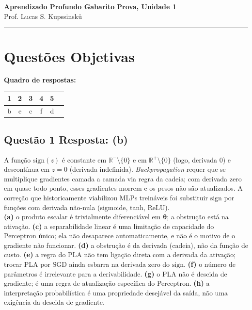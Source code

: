 \documentclass[11pt,a4paper]{article}
\begin{document}
{\Large\bfseries Aprendizado Profundo \textemdash{} Gabarito} \hfill \textbf{Prova, Unidade 1}\\
Prof. Lucas S. Kupssinskü

\rule{\linewidth}{0.8pt}

\section*{Questões Objetivas}

\textbf{Quadro de respostas:}
\begin{center}
\begin{tabular}{|c|c|c|c|c|c|}
\hline
1 & 2 & 3 & 4 & 5 \\\hline
b & e & c & f & d \\\hline
\end{tabular}
\end{center}

\color{blue}

\subsection*{Questão 1 \textemdash{} Resposta: (b)}
A função $\mathrm{sign}(z)$ é constante em $\mathbb{R}^- \setminus \{0\}$ e em $\mathbb{R}^+ \setminus \{0\}$ (logo, derivada $0$) e descontínua em $z = 0$ (derivada indefinida). \textit{Backpropagation} requer que se multiplique gradientes camada a camada via regra da cadeia; com derivada zero em quase todo ponto, esses gradientes morrem e os pesos não são atualizados. A correção que historicamente viabilizou MLPs treináveis foi substituir $\mathrm{sign}$ por funções com derivada não-nula (sigmoide, tanh, ReLU).\\
\textbf{(a)} o produto escalar é trivialmente diferenciável em $\boldsymbol{\theta}$; a obstrução está na ativação.
\textbf{(c)} a separabilidade linear é uma limitação de capacidade do Perceptron único; ela não desaparece automaticamente, e não é o motivo de o gradiente não funcionar.
\textbf{(d)} a obstrução é da derivada (cadeia), não da função de custo.
\textbf{(e)} a regra do PLA não tem ligação direta com a derivada da ativação; trocar PLA por SGD ainda esbarra na derivada zero do $\mathrm{sign}$.
\textbf{(f)} o número de parâmetros é irrelevante para a derivabilidade.
\textbf{(g)} o PLA não é descida de gradiente; é uma regra de atualização específica do Perceptron.
\textbf{(h)} a interpretação probabilística é uma propriedade desejável da saída, não uma exigência da descida de gradiente.
\end{document}
